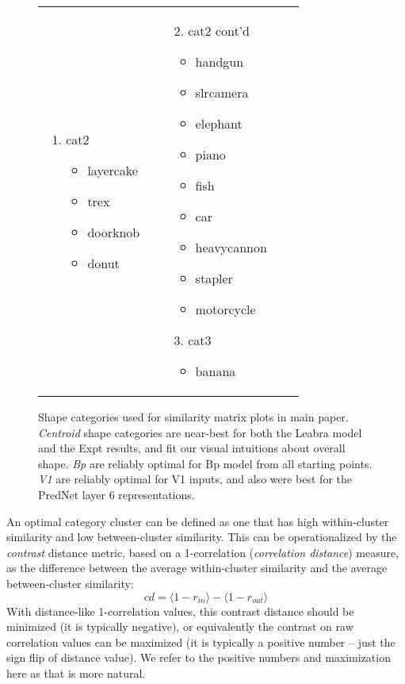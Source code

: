\documentclass[12pt,twoside]{naturefigs}
\newif\myifpdf
\begin{document}
\begin{figure}
\begin{tabular}{llll}
{\begin{enumerate}
\begin{itemize}
	\item tablelamp
	\item chair
	\end{itemize}
	\item cat2
	\begin{itemize}
	\item layercake
	\item trex
	\item doorknob
	\item donut
	\end{itemize}
	\end{enumerate}
	} & 
	 \parbox[t]{1.7in}{\raggedright 	\baselineskip0pt
	\begin{enumerate}
	\item[2.] cat2 cont'd
	\begin{itemize}
	\item handgun
	\item slrcamera
	\item elephant
	\item piano
	\item fish
	\item car
	\item heavycannon
	\item stapler
	\item motorcycle
	\end{itemize}
	\item[3.] cat3
	\begin{itemize}
	\item banana
	\end{itemize}
	\end{enumerate}
	}\\
	\end{tabular}
	\caption{Shape categories used for similarity matrix plots in main paper.  {\em Centroid} shape categories are near-best for both the Leabra model and the Expt results, and fit our visual intuitions about overall shape. {\em Bp} are reliably optimal for Bp model from all starting points.  {\em V1} are reliably optimal for V1 inputs, and also were best for the PredNet layer 6 representations.}
	\label{fig.cats}
\end{figure}

An optimal category cluster can be defined as one that has high within-cluster similarity and low between-cluster similarity.  This can be operationalized by the {\em contrast} distance metric, based on a 1-correlation ({\em correlation distance}) measure, as the difference between the average within-cluster similarity and the average between-cluster similarity:
\begin{equation}
 cd = \langle 1-r_{in} \rangle - \langle 1-r_{out} \rangle 
\end{equation}
With distance-like 1-correlation values, this contrast distance should be minimized (it is typically negative), or equivalently the contrast on raw correlation values can be maximized (it is typically a positive number -- just the sign flip of distance value).  We refer to the positive numbers and maximization here as that is more natural.
\end{document}
